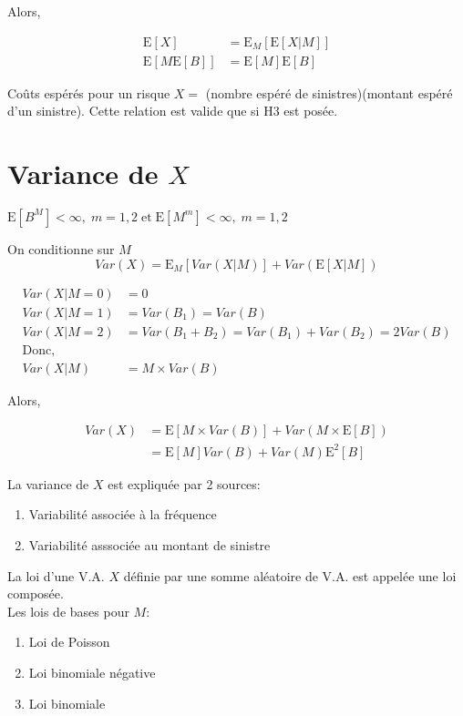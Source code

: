 \documentclass[]{book}
\theoremstyle{definition}
\theoremstyle{definition}
\theoremstyle{definition}
\theoremstyle{remark}
\begin{document}
Alors,

\begin{align*}
\text{E}[X]& =\text{E}_M\left[\text{E}[X|M]\right]\\
\text{E}\left[M\text{E}[B]\right]& =\text{E}[M]\text{E}[B]
\end{align*}

Coûts espérés pour un risque \(X=\) (nombre espéré de sinistres)(montant
espéré d'un sinistre). Cette relation est valide que si H3 est posée.

\section{\texorpdfstring{Variance de
\(X\)}{Variance de X}}\label{variance-de-x}

\(\text{E}[B^M]<\infty,\; m=1,2\; \text{et}\; \text{E}[M^m]<\infty,\;m=1,2\)

On conditionne sur \(M\)\\
\[
Var(X)=\text{E}_M\left[Var(X|M)\right]+Var\left (\text{E}[X|M]\right )
\]

\begin{align*}
Var(X|M=0)& =0\\
Var(X|M=1)& =Var(B_1)=Var(B)\\
Var(X|M=2)& =Var(B_1+B_2)=Var(B_1)+Var(B_2)=2Var(B)\\
\text{Donc,}\\
Var(X|M)& =M\times Var(B)
\end{align*}

Alors,

\begin{align*}
Var(X)& =\text{E}\left [M\times Var(B)\right ]+ Var\left (M\times \text{E}[B]\right )\\
& =\text{E}[M]Var(B)+Var(M)\text{E}^2[B]
\end{align*}

La variance de \(X\) est expliquée par 2 sources:

\begin{enumerate}
\item Variabilité associée à la fréquence 
\item Variabilité asssociée au montant de sinistre
\end{enumerate}

La loi d'une V.A. \(X\) définie par une somme aléatoire de V.A. est
appelée une loi composée.\\
Les lois de bases pour \(M\):

\begin{enumerate}
\item Loi de Poisson
\item Loi binomiale négative 
\item Loi binomiale
\end{enumerate}
\end{document}
